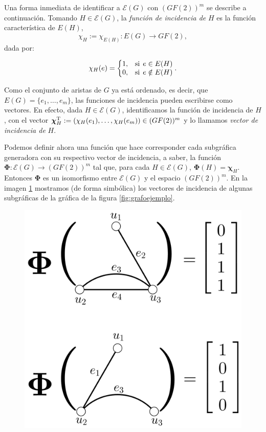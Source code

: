 Una forma inmediata de identificar a $\mathcal{E}(G)$ con $(GF(2))^{m}$ se describe a continuación. Tomando $H \in \mathcal{E}(G)$, la \textit{función de incidencia de} $H$ es la función característica de $E(H)$, $$\chi_{H} := \chi_{E(H)} : E(G) \rightarrow GF(2),$$ dada por:

 $$
 \chi_{H}(e) = \left\{\begin{matrix}
1, & \text{si} \hspace{1.5mm} e \in E(H) \\ 
0, & \text{si} \hspace{1.5mm} e\notin E(H)
\end{matrix}\right..
 $$
 
  Como el conjunto de aristas de $G$ ya está ordenado, es decir, que $E(G) = \{e_{1}, \ldots, e_{m}\}$, las funciones de incidencia pueden escribirse como vectores. En efecto, dada $H \in \mathcal{E}(G)$, identificamos la función de incidencia de $H$, con el vector $\boldsymbol{\chi}_{H}^{\textnormal{T}}:= (\chi_{H}(e_{1}), \ldots, \chi_{H}(e_{m})) \in (GF(2))^{m}$ y lo llamamos \textit{vector de incidencia de} $H$.
 
 Podemos definir ahora una función que hace corresponder cada subgráfica generadora con su respectivo vector de incidencia, a saber, la función $\boldsymbol{\Phi} \colon \mathcal{E}(G) \rightarrow (GF(2))^{m}$ tal que, para cada $H \in \mathcal{E}(G)$, $\boldsymbol{\Phi}(H) = \boldsymbol{\chi}_{H}$. Entonces $\boldsymbol{\Phi}$ es un isomorfismo entre $\mathcal{E}(G)$ y el espacio $(GF(2))^{m}$.
 En la imagen \ref{fig:grafovector1} mostramos (de forma simbólica) los vectores de incidencia de algunas subgráficas de la gráfica de la figura \ref{fig:grafoejemplo}.

 \begin{figure}[H]
    \centering
    \includegraphics[scale=0.2]{img/imgchapter3/grafovector1.jpg}
    \caption{}
    \label{fig:grafovector1}
\end{figure}


